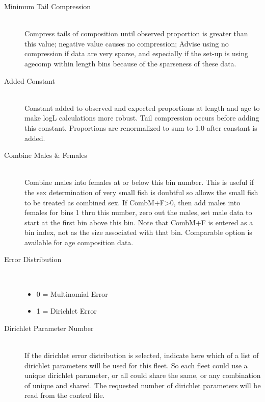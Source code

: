 \begin{description}
	\item[Minimum Tail Compression]\hfill\\
	Compress tails of composition until observed proportion is greater than this value; negative value causes no compression; Advise using no compression if data are very sparse, and especially if the set-up is using agecomp within length bins because of the sparseness of these data.
	\item[Added Constant]\hfill\\
	Constant added to observed and expected proportions at length and age to make logL calculations more robust.  Tail compression occurs before adding this constant.  Proportions are renormalized to sum to 1.0 after constant is added.
	\item[Combine Males \& Females]\hfill\\
	Combine males into females at or below this bin number.  This is useful if the sex determination of very small fish is doubtful so allows the small fish to be treated as combined sex.  If CombM+F>0, then add males into females for bins 1 thru this number, zero out the males, set male data to start at the first bin above this bin.  Note that CombM+F is entered as a bin index, not as the size associated with that bin.  Comparable option is available for age composition data.
	\item[Error Distribution]\
	\begin{itemize}
		\item 0 = Multinomial Error
		\item 1 = Dirichlet Error
	\end{itemize}
	\item[Dirichlet Parameter Number]\hfill\\
	If the dirichlet error distribution is selected, indicate here which of a list of dirichlet parameters will be used for this fleet.  So each fleet could use a unique dirichlet parameter, or all could share the same, or any combination of unique and shared.  The requested number of dirichlet parameters will be read from the control file.
\end{description}

\hypertarget{CompTiming}{}

